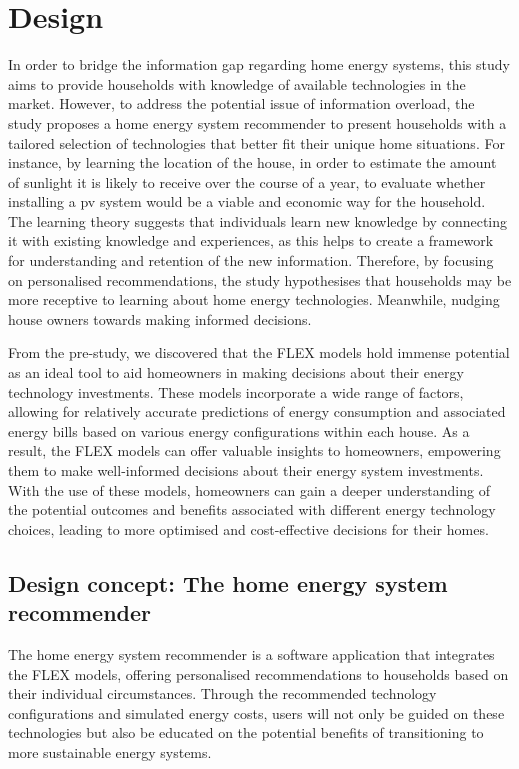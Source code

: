 \chapter{Design} 

In order to bridge the information gap regarding home energy systems, this study aims to provide households with knowledge of available technologies in the market. 
However, to address the potential issue of information overload, the study proposes a home energy system recommender to present households with a tailored selection of technologies that better fit their unique home situations. 
For instance, by learning the location of the house, in order to estimate the amount of sunlight it is likely to receive over the course of a year, to evaluate whether installing a \gls{pv} system would be a viable and economic way for the household.
The learning theory suggests that individuals learn new knowledge by connecting it with existing knowledge and experiences, as this helps to create a framework for understanding and retention of the new information.
Therefore, by focusing on personalised recommendations, the study hypothesises that households may be more receptive to learning about home energy technologies. 
Meanwhile, nudging house owners towards making informed decisions. 

From the pre-study, we discovered that the FLEX models hold immense potential as an ideal tool to aid homeowners in making decisions about their energy technology investments. 
These models incorporate a wide range of factors, allowing for relatively accurate predictions of energy consumption and associated energy bills based on various energy configurations within each house. 
As a result, the FLEX models can offer valuable insights to homeowners, empowering them to make well-informed decisions about their energy system investments. 
With the use of these models, homeowners can gain a deeper understanding of the potential outcomes and benefits associated with different energy technology choices, leading to more optimised and cost-effective decisions for their homes.


\section{Design concept: The home energy system recommender}

The home energy system recommender is a software application that integrates the FLEX models,
offering personalised recommendations to households based on their individual circumstances.
Through the recommended technology configurations and simulated energy costs, 
users will not only be guided on these technologies but also be educated on the potential benefits of transitioning to more sustainable energy systems. 


